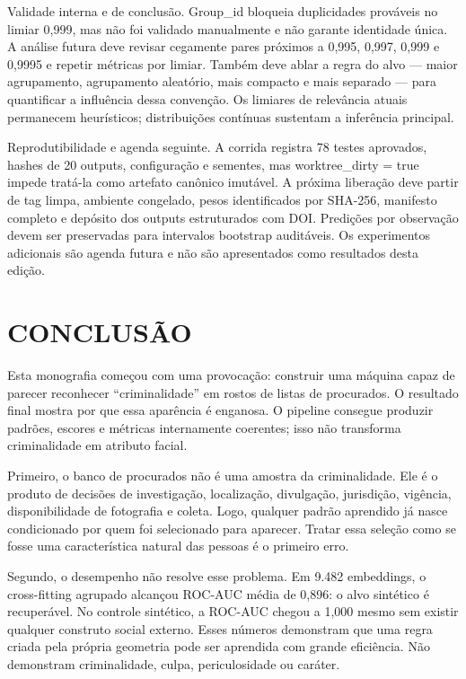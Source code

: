 Validade interna e de conclusão. Group\_id bloqueia duplicidades prováveis no limiar 0,999, mas não foi validado manualmente e não garante identidade única. A análise futura deve revisar cegamente pares próximos a 0,995, 0,997, 0,999 e 0,9995 e repetir métricas por limiar. Também deve ablar a regra do alvo --- maior agrupamento, agrupamento aleatório, mais compacto e mais separado --- para quantificar a influência dessa convenção. Os limiares de relevância atuais permanecem heurísticos; distribuições contínuas sustentam a inferência principal.

Reprodutibilidade e agenda seguinte. A corrida registra 78 testes aprovados, hashes de 20 outputs, configuração e sementes, mas worktree\_dirty = true impede tratá-la como artefato canônico imutável. A próxima liberação deve partir de tag limpa, ambiente congelado, pesos identificados por SHA-256, manifesto completo e depósito dos outputs estruturados com DOI. Predições por observação devem ser preservadas para intervalos bootstrap auditáveis. Os experimentos adicionais são agenda futura e não são apresentados como resultados desta edição.

\chapter{CONCLUSÃO}

Esta monografia começou com uma provocação: construir uma máquina capaz de parecer reconhecer ``criminalidade'' em rostos de listas de procurados. O resultado final mostra por que essa aparência é enganosa. O pipeline consegue produzir padrões, escores e métricas internamente coerentes; isso não transforma criminalidade em atributo facial.

Primeiro, o banco de procurados não é uma amostra da criminalidade. Ele é o produto de decisões de investigação, localização, divulgação, jurisdição, vigência, disponibilidade de fotografia e coleta. Logo, qualquer padrão aprendido já nasce condicionado por quem foi selecionado para aparecer. Tratar essa seleção como se fosse uma característica natural das pessoas é o primeiro erro.

Segundo, o desempenho não resolve esse problema. Em 9.482 embeddings, o cross-fitting agrupado alcançou ROC-AUC média de 0,896: o alvo sintético é recuperável. No controle sintético, a ROC-AUC chegou a 1,000 mesmo sem existir qualquer construto social externo. Esses números demonstram que uma regra criada pela própria geometria pode ser aprendida com grande eficiência. Não demonstram criminalidade, culpa, periculosidade ou caráter.

